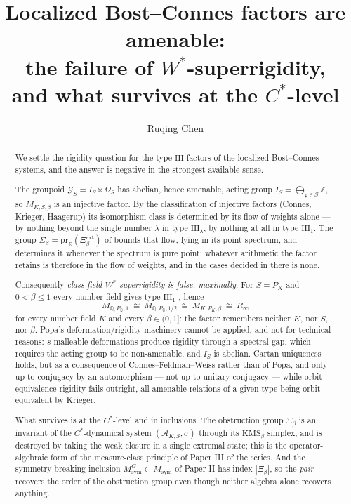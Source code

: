 \documentclass[11pt]{amsart}
\title[Amenability and the failure of superrigidity]{Localized Bost--Connes factors are amenable:\\ the failure of $W^*$-superrigidity,\\ and what survives at the $C^*$-level}
\author{Ruqing Chen}
\date{}
\numberwithin{equation}{section}
\theoremstyle{definition}
\theoremstyle{remark}
\newcommand{\Z}{\mathbb{Z}}
\newcommand{\Q}{\mathbb{Q}}
\newcommand{\R}{\mathbb{R}}
\newcommand{\cA}{\mathcal{A}}
\newcommand{\cG}{\mathcal{G}}
\newcommand{\pp}{\mathfrak{p}}
\newcommand{\Msym}{M_{\mathrm{sym}}}
\begin{document}
\begin{abstract}
We settle the rigidity question for the type $\mathrm{III}$ factors of the localized
Bost--Connes systems, and the answer is negative in the strongest available sense.

The groupoid $\cG_S=I_S\ltimes\widetilde\Omega_S$ has abelian, hence amenable, acting group
$I_S=\bigoplus_{\pp\in S}\Z$, so $M_{K,S,\beta}$ is an injective factor. By the classification of
injective factors (Connes, Krieger, Haagerup) its isomorphism class is determined by its flow
of weights alone --- by nothing beyond the single number $\lambda$ in type
$\mathrm{III}_\lambda$, by nothing at all in type $\mathrm{III}_1$. The group
$\Sigma_\beta=\mathrm{pr}_\R(\Xi^{\mathrm{ext}}_\beta)$ of \cite{SeriesI} bounds that flow, lying
in its point spectrum, and determines it whenever the spectrum is pure point; whatever
arithmetic the factor retains is therefore in the flow of weights, and in the cases decided
in \cite{SeriesI} there is none.

Consequently \emph{class field $W^*$-superrigidity is false, maximally}. For $S=P_K$ and
$0<\beta\le1$ every number field gives type $\mathrm{III}_1$ \cite[Thm.~3.2]{SeriesI}, hence
\[
M_{\Q,P_\Q,1}\ \cong\ M_{\Q,P_\Q,1/2}\ \cong\ M_{K,P_K,\beta}\ \cong\ R_\infty
\]
for every number field $K$ and every $\beta\in(0,1]$: the factor remembers neither $K$, nor
$S$, nor $\beta$. Popa's deformation/rigidity machinery cannot be applied, and not for
technical reasons: $s$-malleable deformations produce rigidity through a spectral gap, which
requires the acting group to be non-amenable, and $I_S$ is abelian. Cartan uniqueness holds,
but as a consequence of Connes--Feldman--Weiss rather than of Popa, and only up to conjugacy
by an automorphism --- not up to unitary conjugacy --- while orbit equivalence rigidity fails
outright, all amenable relations of a given type being orbit equivalent by Krieger.

What survives is at the $C^*$-level and in inclusions. The obstruction group $\Xi_\beta$ is
an invariant of the $C^*$-dynamical system $(\cA_{K,S},\sigma)$ through its
$\mathrm{KMS}_\beta$ simplex, and is destroyed by taking the weak closure in a single
extremal state; this is the operator-algebraic form of the measure-class principle of
Paper III of the series. And the symmetry-breaking inclusion
$\Msym^{G}\subset\Msym$ of Paper II has index $|\Xi_\beta|$, so the \emph{pair} recovers the
order of the obstruction group even though neither algebra alone recovers anything.
\end{abstract}
\end{document}

